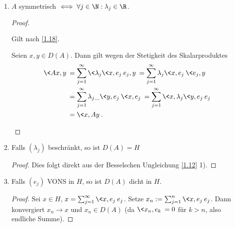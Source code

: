 \begin{ex}
\begin{enumerate}[1)]
\begin{enumerate}[a)]
\begin{proof}
\begin{align*}
							&= \Big\< \sum_{j=1}^\infty \lambda_j \<x,e_j\> e_j, e_k \Big\> \\
							&= \lambda_k \<x,e_k\> \<e_k, e_k\>
							= \lambda_k \<x,e_k\>. 
							\end{align*}
						Damit gilt $ (\lambda-\lambda_k)\<x,e_k\>=0, \lambda\neq \lambda_k $ und $ \<x,e_k\>=0 $ für alle $ k\in \N $. Dies impliziert $ x=0 $ oder zumindest	 $Ax = \sum_{j=1}^\infty \lambda_j \<x,e_j\> e_j = 0$.
						Damit sind alle Eigenwerte von $A$ gegeben durch
						\[
							\{ \lambda_j : j \in \N \} \quad \text{oder}\quad \{\lambda_j : j \in \N\} \cup \{0\}.
						\]
					\end{proof}
			\end{enumerate}
		\item
			$A$ symmetrisch $\iff \forall j \in \N : \lambda_j \in \R$.
			\begin{proof}
				\begin{seg}[$\implies$]
					Gilt nach \ref{1.18}.
				\end{seg}
				\begin{seg}[$\Longleftarrow$]
					Seien $x,y \in D(A)$. Dann gilt wegen der Stetigkeit des Skalarproduktes
					\begin{align*}
						\<Ax,y\>
						&= \sum_{j=1}^\infty \<\lambda_j \<x,e_j\> e_j, y\> 
						= \sum_{j=1}^\infty \lambda_j \<x,e_j\> \<e_j, y\> \\
						&= \sum_{j=1}^\infty \lambda_j \_{\<y,e_j\>} \<x, e_j\> 
						= \sum_{j=1}^\infty \<x,\lambda_j \<y,e_j\> e_j\> \\
						&= \<x, Ay\>.
					\end{align*}
				\end{seg}
			\end{proof}
		\item
			Falls $(\lambda_j)$ beschränkt, so ist $D(A) = H$
			\begin{proof}
				Dies folgt direkt aus der Besselschen Ungleichung \ref{1.12} 1).
			\end{proof}
		\item
			Falls $(e_j)$ VONS in $H$, so ist $D(A)$ dicht in $H$.
			\begin{proof}
				Sei $x \in H$, $x = \sum_{j=1}^\infty \<x,e_j\> e_j$.
				Setze $x_n := \sum_{j=1}^n \<x,e_j\> e_j$.
				Dann konvergiert $x_n \to x$ und $x_n \in D(A)$ (da $\<x_n,e_k\> = 0$ für $k > n$, also endliche Summe).
			\end{proof}
	\end{enumerate}
\end{ex}


